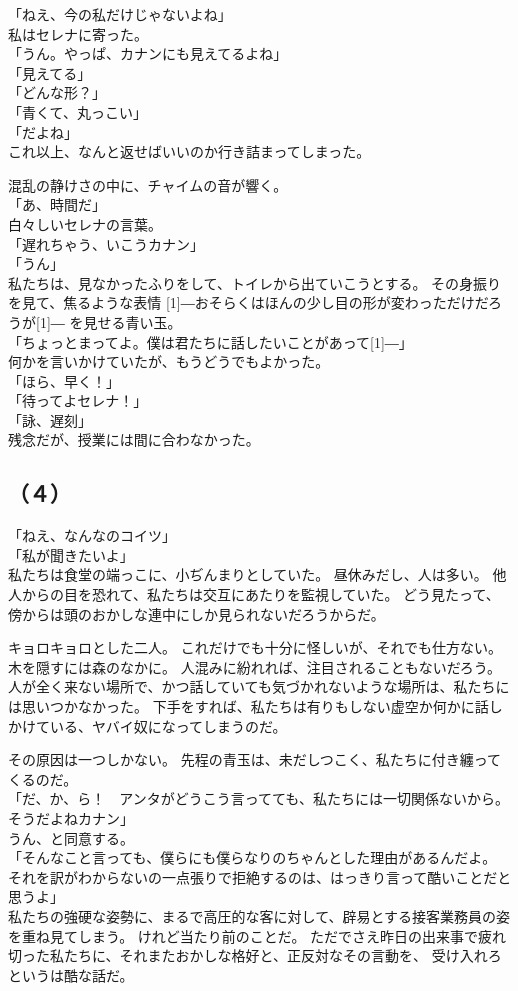 \documentclass[../IHMain]{subfiles}
\begin{document}
「ねえ、今の私だけじゃないよね」\\
私はセレナに寄った。\\
「うん。やっぱ、カナンにも見えてるよね」\\
「見えてる」\\
「どんな形？」\\
「青くて、丸っこい」\\
「だよね」\\
これ以上、なんと返せばいいのか行き詰まってしまった。

混乱の静けさの中に、チャイムの音が響く。\\
「あ、時間だ」\\
白々しいセレナの言葉。\\
「遅れちゃう、いこうカナン」\\
「うん」\\
私たちは、見なかったふりをして、トイレから出ていこうとする。
その身振りを見て、焦るような表情
\scalebox{3}[1]{―}おそらくはほんの少し目の形が変わっただけだろうが\scalebox{3}[1]{―}
を見せる青い玉。\\
「ちょっとまってよ。僕は君たちに話したいことがあって\scalebox{3}[1]{―}」\\
何かを言いかけていたが、もうどうでもよかった。\\
「ほら、早く！」\\
「待ってよセレナ！」\\

「詠、遅刻」\\
残念だが、授業には間に合わなかった。

\subsection*{（４）}
「ねえ、なんなのコイツ」\\
「私が聞きたいよ」\\
私たちは食堂の端っこに、小ぢんまりとしていた。
昼休みだし、人は多い。
他人からの目を恐れて、私たちは交互にあたりを監視していた。
どう見たって、傍からは頭のおかしな連中にしか見られないだろうからだ。

キョロキョロとした二人。
これだけでも十分に怪しいが、それでも仕方ない。
木を隠すには森のなかに。
人混みに紛れれば、注目されることもないだろう。
人が全く来ない場所で、かつ話していても気づかれないような場所は、私たちには思いつかなかった。
下手をすれば、私たちは有りもしない虚空か何かに話しかけている、ヤバイ奴になってしまうのだ。

その原因は一つしかない。
先程の青玉は、未だしつこく、私たちに付き纏ってくるのだ。\\
「だ、か、ら！　アンタがどうこう言ってても、私たちには一切関係ないから。そうだよねカナン」\\
うん、と同意する。\\
「そんなこと言っても、僕らにも僕らなりのちゃんとした理由があるんだよ。
それを訳がわからないの一点張りで拒絶するのは、はっきり言って酷いことだと思うよ」\\
私たちの強硬な姿勢に、まるで高圧的な客に対して、辟易とする接客業務員の姿を重ね見てしまう。
けれど当たり前のことだ。
ただでさえ昨日の出来事で疲れ切った私たちに、それまたおかしな格好と、正反対なその言動を、
受け入れろというは酷な話だ。
\end{document}
